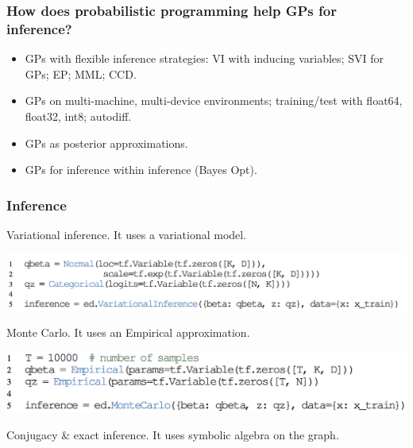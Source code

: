 \documentclass[10pt,
               xcolor={usenames,dvipsnames},
               hyperref={colorlinks,linktoc=all,citecolor=Plum,linkcolor=MidnightBlue,urlcolor=MidnightBlue},noamssymb]{beamer}
\begin{document}
\begin{frame}
\frametitle{How does probabilistic programming help GPs for inference?}
\begin{itemize}
\item
  GPs with flexible inference strategies:
  VI with inducing variables;
  SVI for GPs;
  EP;
  MML; CCD.
\item
  GPs on multi-machine, multi-device environments;
  training/test with float64, float32, int8; autodiff.
\item
  GPs as posterior approximations.
\item
  GPs for inference within inference (Bayes Opt).
\end{itemize}
\end{frame}

\begin{frame}
\frametitle{Inference}
Variational inference. It uses a variational model.
\begin{center}
\vspace{-2.0ex}
\includegraphics[height=0.18\textheight]{img/inference_variational.png}
\end{center}
Monte Carlo. It uses an Empirical approximation.
\begin{center}
\includegraphics[height=0.17\textheight]{img/inference_monte.png}
\end{center}

Conjugacy \& exact inference. It uses symbolic algebra on the graph.
\end{frame}
\end{document}
